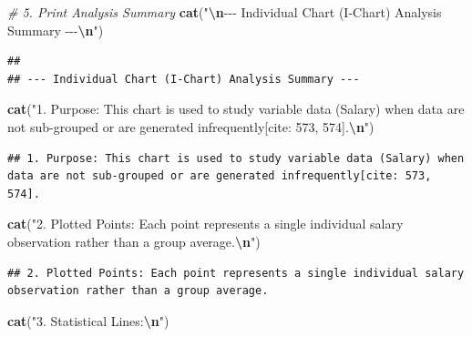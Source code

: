 \documentclass[
]{article}
\newenvironment{Shaded}{\begin{snugshade}}{\end{snugshade}}
\newcommand{\CommentTok}[1]{\textcolor[rgb]{0.56,0.35,0.01}{\textit{#1}}}
\newcommand{\FunctionTok}[1]{\textcolor[rgb]{0.13,0.29,0.53}{\textbf{#1}}}
\newcommand{\NormalTok}[1]{#1}
\newcommand{\SpecialCharTok}[1]{\textcolor[rgb]{0.81,0.36,0.00}{\textbf{#1}}}
\newcommand{\StringTok}[1]{\textcolor[rgb]{0.31,0.60,0.02}{#1}}
\begin{document}
\begin{Shaded}
\begin{Highlighting}[]
\CommentTok{\# 5. Print Analysis Summary}
\FunctionTok{cat}\NormalTok{(}\StringTok{"}\SpecialCharTok{\textbackslash{}n}\StringTok{{-}{-}{-} Individual Chart (I{-}Chart) Analysis Summary {-}{-}{-}}\SpecialCharTok{\textbackslash{}n}\StringTok{"}\NormalTok{)}
\end{Highlighting}
\end{Shaded}

\begin{verbatim}
## 
## --- Individual Chart (I-Chart) Analysis Summary ---
\end{verbatim}

\begin{Shaded}
\begin{Highlighting}[]
\FunctionTok{cat}\NormalTok{(}\StringTok{"1. Purpose: This chart is used to study variable data (Salary) when data are not sub{-}grouped or are generated infrequently[cite: 573, 574].}\SpecialCharTok{\textbackslash{}n}\StringTok{"}\NormalTok{)}
\end{Highlighting}
\end{Shaded}

\begin{verbatim}
## 1. Purpose: This chart is used to study variable data (Salary) when data are not sub-grouped or are generated infrequently[cite: 573, 574].
\end{verbatim}

\begin{Shaded}
\begin{Highlighting}[]
\FunctionTok{cat}\NormalTok{(}\StringTok{"2. Plotted Points: Each point represents a single individual salary observation rather than a group average.}\SpecialCharTok{\textbackslash{}n}\StringTok{"}\NormalTok{)}
\end{Highlighting}
\end{Shaded}

\begin{verbatim}
## 2. Plotted Points: Each point represents a single individual salary observation rather than a group average.
\end{verbatim}

\begin{Shaded}
\begin{Highlighting}[]
\FunctionTok{cat}\NormalTok{(}\StringTok{"3. Statistical Lines:}\SpecialCharTok{\textbackslash{}n}\StringTok{"}\NormalTok{)}
\end{Highlighting}
\end{Shaded}
\end{document}

